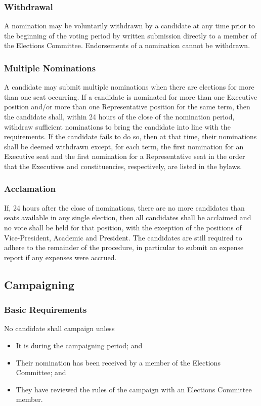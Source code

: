 \subsubsection{Withdrawal}
A nomination may be voluntarily withdrawn by a candidate at any time prior to the beginning of the voting period by written submission directly to a member of the Elections Committee.
Endorsements of a nomination cannot be withdrawn.

\subsubsection{Multiple Nominations}
A candidate may submit multiple nominations when there are elections for more than one seat occurring.
If a candidate is nominated for more than one Executive position and/or more than one Representative position for the same term, then the candidate shall, within 24 hours of the close of the nomination period, withdraw sufficient nominations to bring the candidate into line with the requirements.
If the candidate fails to do so, then at that time, their nominations shall be deemed withdrawn except, for each term, the first nomination for an Executive seat and the first nomination for a Representative seat in the order that the Executives and constituencies, respectively, are listed in the bylaws.

\subsubsection{Acclamation}
If, 24 hours after the close of nominations, there are no more candidates than seats available in any single election, then all candidates shall be acclaimed and no vote shall be held for that position, with the exception of the positions of Vice-President, Academic and President.
The candidates are still required to adhere to the remainder of the procedure, in particular to submit an expense report if any expenses were accrued.

\subsection{Campaigning}
\subsubsection{Basic Requirements}
No candidate shall campaign unless
\begin{itemize}
	\item It is during the campaigning period; and
	\item Their nomination has been received by a member of the Elections Committee; and
	\item They have reviewed the rules of the campaign with an Elections Committee member.
\end{itemize}

